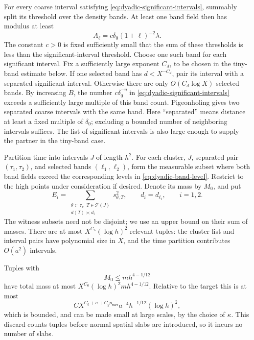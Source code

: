 For every coarse interval satisfying
\eqref{eq:dyadic-significant-intervals}, summably split its threshold
over the density bands.  At least one band field then has modulus at
least
\begin{equation}\label{eq:dyadic-band-level}
 A_\ell=c\delta_0(1+\ell)^{-2}\lambda.
\end{equation}
The constant $c>0$ is fixed sufficiently small that the sum of these
thresholds is less than the significant-interval threshold.  Choose one
such band for each significant interval. Fix a sufficiently large exponent
$C_d$, to be chosen in the tiny-band estimate below. If one selected band has
$d<X^{-C_d}$, pair its interval with a separated significant interval.
Otherwise there are only $O(C_d\log X)$ selected bands.  By increasing
$B$, the number $c\delta_0^{-\eta}$ in
\eqref{eq:dyadic-significant-intervals} exceeds a sufficiently large
multiple of this band count.  Pigeonholing gives two separated coarse
intervals with the same band.  Here ``separated'' means distance at least
a fixed multiple of $\delta_0$; excluding a bounded number of neighboring
intervals suffices.  The list of significant intervals is also large
enough to supply the partner in the tiny-band case.

Partition time into intervals $J$ of length $h^2$.  For each cluster,
$J$, separated pair $(\tau_1,\tau_2)$, and selected bands
$(\ell_1,\ell_2)$, form the measurable subset where both band fields
exceed the corresponding levels in \eqref{eq:dyadic-band-level}.
Restrict to the high points under consideration if desired.  Denote its
mass by $M_0$, and put
\begin{equation}\label{eq:dyadic-class-energy}
 E_i=\sum_{\substack{\theta\subset\tau_i,\ T\in\mathcal T(J)\\
                         d(T)\asymp d_i}}
                 s_{\theta,T}^2,
 \qquad d_i=d_{\ell_i},\qquad i=1,2.
\end{equation}
The witness subsets need not be disjoint; we use an upper bound on their
sum of masses.  There are at most $X^{C_6}(\log h)^2$ relevant tuples:
the cluster list and interval pairs have polynomial size in $X$, and
the time partition contributes $O(a^2)$ intervals.

Tuples with
\begin{equation}\label{eq:dyadic-small-mass}
 M_0\leq mh^{4-1/12}
\end{equation}
have total mass at most
$X^{C_6}(\log h)^2mh^{4-1/12}$.  Relative to the target this is at most
\[
 C X^{C_6+\sigma+C_gp_{\max}}
          a^{-4}h^{-1/12}(\log h)^2,
\]
which is bounded, and can be made small at large scales, by the choice
of $\kappa$.  This discard counts tuples before normal spatial slabs
are introduced, so it incurs no number of slabs.

